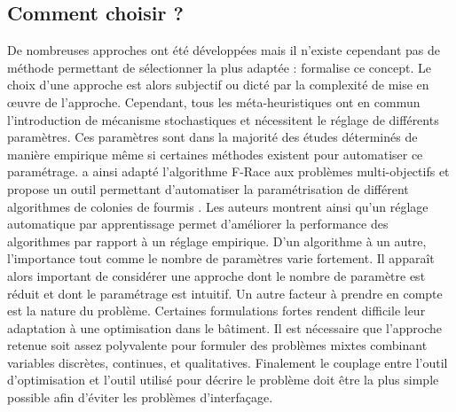\subsection{Comment choisir ?} %
\label{sub:comment_choisir}
De nombreuses approches ont été développées mais il n’existe cependant pas de méthode
permettant de sélectionner la plus adaptée : \cite{Wolpert199767} formalise
ce concept. Le choix d’une approche est alors subjectif ou dicté par la complexité
de mise en œuvre de l’approche.
Cependant, tous les méta-heuristiques ont en commun l’introduction de
mécanisme stochastiques et nécessitent le réglage de différents paramètres.
Ces paramètres sont dans la majorité des études déterminés de manière empirique
même si certaines méthodes existent pour automatiser ce paramétrage. \cite{Lopez-Ibanez2012861}
a ainsi adapté l’algorithme F-Race \parencite{Birattari2010311} aux problèmes multi-objectifs
et propose un outil permettant d’automatiser la paramétrisation de différent algorithmes de colonies
de fourmis \parencite{Lopez-Ibanez2012861}.
Les auteurs montrent ainsi qu’un réglage automatique par apprentissage permet d’améliorer
la performance des algorithmes par rapport à un réglage empirique.
D’un algorithme à un autre, l’importance tout comme le nombre de paramètres varie
fortement. Il apparaît alors important de considérer une approche dont le nombre
de paramètre est réduit et dont le paramétrage est intuitif.
Un autre facteur à prendre en compte est la nature du problème. Certaines formulations
fortes rendent difficile leur adaptation à une optimisation dans le bâtiment.
Il est nécessaire que l’approche retenue soit assez polyvalente pour formuler des
problèmes mixtes combinant variables discrètes, continues, et qualitatives.
Finalement le couplage entre l’outil d’optimisation et l’outil utilisé pour décrire
le problème doit être la plus simple possible afin d’éviter les problèmes d’interfaçage.


